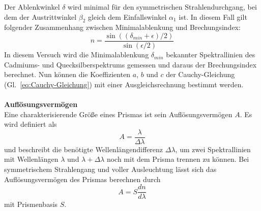 \documentclass[12pt,a4paper]{article}
\begin{document}
Der Ablenkwinkel $\delta$ wird minimal für den symmetrischen Strahlendurchgang, bei dem der Austrittwinkel $\beta_2$ gleich dem Einfallswinkel $\alpha_1$ ist. In diesem Fall gilt folgender Zusammenhang zwischen Minimalablenkung und Brechungsindex:
\begin{equation}\label{eq:n_aus_delmin}
n=\frac{\sin((\delta_{min}+\epsilon)/2)}{\sin(\epsilon/2)}
\end{equation}
In diesem Versuch wird die Minimalablenkung $\delta_{min}$ bekannter Spektrallinien des Cadmiums- und Quecksilberspektrums gemessen und daraus der Brechungsindex berechnet. Nun können die Koeffizienten $a$, $b$ und $c$ der Cauchy-Gleichung (Gl.~\eqref{eq:Cauchy-Gleichung}) mit einer Ausgleichsrechnung bestimmt werden.\\\\
\textbf{Auflösungsvermögen}\\
Eine charakterisierende Größe eines Prismas ist sein Auflösungsvermögen $A$. Es wird definiert als 
\begin{equation}
A=\frac{\lambda}{\Delta\lambda}
\end{equation}
und beschreibt die benötigte Wellenlängendifferenz $\Delta\lambda$, um zwei Spektrallinien mit Wellenlängen $\lambda$ und $\lambda+\Delta\lambda$ noch mit dem Prisma trennen zu können. Bei symmetrischem Strahlengang und voller Ausleuchtung lässt sich das Auflösungsvermögen des Prismas berechnen durch
\begin{equation}
A=S\frac{dn}{d\lambda}
\end{equation}
mit Prismenbasis $S$.
\end{document}
